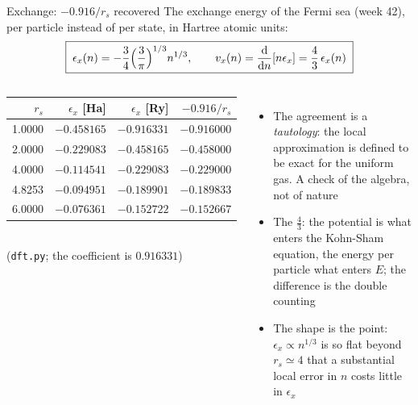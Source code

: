 \documentclass[aspectratio=169,10pt]{beamer}
\newcommand{\dd}{\mathrm{d}}
\begin{document}
\begin{frame}{Exchange: $-0.916/r_s$ recovered}
  The exchange energy of the Fermi sea (week 42), per particle instead of per state, in Hartree atomic units:
  \[
    \boxed{\;\epsilon_x(n)=-\frac34\Bigl(\frac{3}{\pi}\Bigr)^{1/3}n^{1/3},\qquad v_x(n)=\frac{\dd}{\dd n}[n\epsilon_x]=\frac43\,\epsilon_x(n)\;}
  \]
  \begin{columns}[T]
    \begin{center}\small
    \begin{tabular}{@{}rrrr@{}}\toprule
    $r_s$ & $\epsilon_x$ [Ha] & $\epsilon_x$ [Ry] & $-0.916/r_s$\\\midrule
    1.0000 & $-0.458165$ & $-0.916331$ & $-0.916000$\\
    2.0000 & $-0.229083$ & $-0.458165$ & $-0.458000$\\
    4.0000 & $-0.114541$ & $-0.229083$ & $-0.229000$\\
    4.8253 & $-0.094951$ & $-0.189901$ & $-0.189833$\\
    6.0000 & $-0.076361$ & $-0.152722$ & $-0.152667$\\\bottomrule
    \end{tabular}\\[2pt]
    (\texttt{dft.py}; the coefficient is $0.916331$)
    \end{center}
    \begin{itemize}
      \item The agreement is a \emph{tautology}: the local approximation is defined to be exact for the uniform gas. A check of the algebra, not of nature
      \item The $\frac43$: the potential is what enters the Kohn-Sham equation, the energy per particle what enters $E$; the difference is the double counting
      \item The shape is the point: $\epsilon_x\propto n^{1/3}$ is so flat beyond $r_s\simeq4$ that a substantial local error in $n$ costs little in $\epsilon_x$
    \end{itemize}
  \end{columns}
\end{frame}
\end{document}
